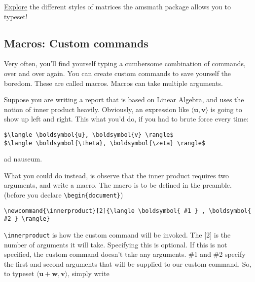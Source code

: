 \documentclass[12pt, letterpaper]{article}
\theoremstyle{remark}
\newcommand{\innerproduct}[2]{\langle \boldsymbol{ #1 } , \boldsymbol{ #2 } \rangle}
\begin{document}

\href{https://www.overleaf.com/learn/latex/Matrices}{Explore} the different styles of matrices the amsmath package allows you to typeset! \cite{matrices}

\subsection{Macros: Custom commands}
Very often, you'll find yourself typing a cumbersome combination of commands, over and over again. You can create custom commands to save yourself the boredom. These are called macros. Macros can take multiple arguments.

Suppose you are writing a report that is based on Linear Algebra, and uses the notion of inner product heavily. Obviously, an expression like $\innerproduct{u}{v}$ is going to show up left and right. This what you'd do, if you had to brute force every time:
\begin{lstlisting}
$\langle \boldsymbol{u}, \boldsymbol{v} \rangle$
$\langle \boldsymbol{\theta}, \boldsymbol{\zeta} \rangle$
\end{lstlisting}
ad nauseum.

What you could do instead, is observe that the inner product requires two arguments, and write a macro. The macro is to be defined in the preamble. (before you declare \verb!\begin{document}!)

\begin{lstlisting}
\newcommand{\innerproduct}[2]{\langle \boldsymbol{ #1 } , \boldsymbol{ #2 } \rangle}
\end{lstlisting}

\verb!\innerproduct! is how the custom command will be invoked. The [2] is the number of arguments it will take. Specifying this is optional. If this is not specified, the custom command doesn't take any arguments. \#1 and \#2 specify the first and second arguments that will be supplied to our custom command. So, to typeset $\innerproduct{u+w}{v}$, simply write
\end{document}

